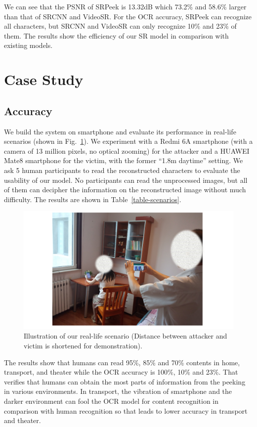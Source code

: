 We can see that the PSNR of SRPeek is 13.32dB which 73.2\% and 58.6\% larger than that of SRCNN and VideoSR. For the OCR accuracy, SRPeek can recognize all characters, but SRCNN and VideoSR can only recognize 10\% and 23\% of them. The results show the efficiency of our SR model in comparison with existing models.

\section{Case Study}
\label{case-study}
\subsection{Accuracy}

We build the system on smartphone and evaluate its performance in real-life scenarios (shown in Fig.~\ref{fig-reallife}). We experiment with a Redmi 6A smartphone (with a camera of 13 million pixels, no optical zooming) for the attacker and a HUAWEI Mate8 smartphone for the victim, with the former ``1.8m daytime'' setting. We ask 5 human participants to read the reconstructed characters to evaluate the usability of our model. No participants can read the unprocessed images, but all of them can decipher the information on the reconstructed image without much difficulty. The results are shown in Table~\ref{table-scenarios}.
\begin{figure}
	\centering
	\includegraphics[width=0.80\linewidth]{pic/reallife.pdf}
    \caption{Illustration of our real-life scenario (Distance between attacker and victim is shortened for demonstration).}
	\label{fig-reallife}
\end{figure}

The results show that humans can read 95\%, 85\% and 70\% contents in home, transport, and theater while the OCR accuracy is 100\%, 10\% and 23\%. That verifies that humans can obtain the most parts of information from the peeking in various environments. In transport, the vibration of smartphone and the darker environment can fool the OCR model for content recognition in comparison with human recognition so that leads to lower accuracy in transport and theater.

